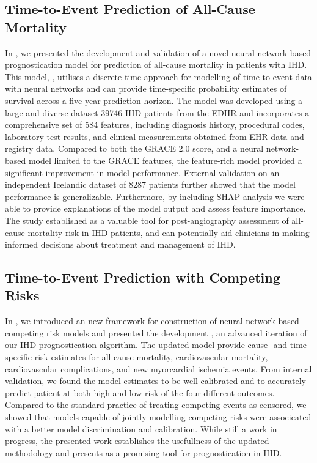 \subsection{Time-to-Event Prediction of All-Cause Mortality}

In \studyii{}, 
we presented the development and validation of 
a novel neural network-based prognostication model
for prediction of all-cause mortality in 
patients with \ac{IHD}.
This model, , utilises a discrete-time approach 
for modelling of time-to-event data with neural networks and
can provide time-specific probability estimates of survival
across a five-year prediction horizon.
The model was developed using a large and diverse dataset 
\num{39746} \ac{IHD} patients from the \ac{EDHR}
and incorporates a comprehensive set of 584 features,
including diagnosis history, procedural codes, laboratory test results,
and clinical measurements obtained from \ac{EHR} data and registry data.
Compared to both the \acs{GRACE} 2.0 score, 
and a neural network-based model limited to the \acs{GRACE} features,
the feature-rich  model provided a significant improvement
in model performance.
External validation on an independent Icelandic dataset of \num{8287} patients 
further showed that the model performance is generalizable.
Furthermore, by including \acs{SHAP}-analysis we were able to provide
explanations of the model output and assess feature importance.
The study established  as a valuable tool for post-angiography 
assessment of all-cause mortality risk in \ac{IHD} patients,
and can potentially aid clinicians in making informed decisions 
about treatment and management of \ac{IHD}.

\subsection{Time-to-Event Prediction with Competing Risks}

In \studyiii{}, 
we introduced an new framework for construction of neural network-based
competing risk models and presented the development , 
an advanced iteration of our \ac{IHD} prognostication algorithm.
The updated  model provide cause- and time-specific 
risk estimates for all-cause mortality, cardiovascular mortality, 
cardiovascular complications, and new myorcardial ischemia events.
From internal validation, we found the model estimates to
be well-calibrated and to accurately predict patient at 
both high and low risk of the four different outcomes.
Compared to the standard practice of treating competing events as 
censored, we showed that models capable of jointly modelling 
competing risks were associcated with a better model discrimination
and calibration.
While still a work in progress, the presented work establishes
the usefullness of the updated methodology and presents
 as a promising tool for prognostication in 
\ac{IHD}.


